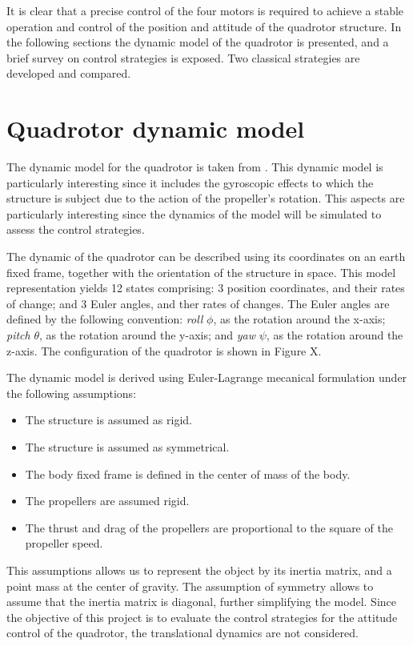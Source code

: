 \documentclass[12pt]{article}
\begin{document}
It is clear that a precise control of the four motors is required to achieve a stable operation and control of the position and attitude of the quadrotor structure. In the following sections the dynamic model of the quadrotor is presented, and a brief survey on control strategies is exposed. Two classical strategies are developed and compared.

\section{Quadrotor dynamic model}
The dynamic model for the quadrotor is taken from \cite{Boua04}. This dynamic model is particularly interesting since it includes the gyroscopic effects to which the structure is subject due to the action of the propeller's rotation. This aspects are particularly interesting since the dynamics of the model will be simulated to assess the control strategies.

The dynamic of the quadrotor can be described using its coordinates on an earth fixed frame, together with the orientation of the structure in space. This model representation yields 12 states comprising: 3 position coordinates, and their rates of change; and 3 Euler angles, and ther rates of changes. The Euler angles are defined by the following convention: \emph{roll} $\phi$, as the rotation around the x-axis; \emph{pitch} $\theta$, as the rotation around the y-axis; and \emph{yaw} $\psi$, as the rotation around the z-axis. The configuration of the quadrotor is shown in Figure X.

The dynamic model is derived using Euler-Lagrange mecanical formulation under the following assumptions:

\begin{itemize}
\item The structure is assumed as rigid.
\item The structure is assumed as symmetrical.
\item The body fixed frame is defined in the center of mass of the body.
\item The propellers are assumed rigid.
\item The thrust and drag of the propellers are proportional to the square of the propeller speed.
\end{itemize}

This assumptions allows us to represent the object by its inertia matrix, and a point mass at the center of gravity. The assumption of symmetry allows to assume that the inertia matrix is diagonal, further simplifying the model. Since the objective of this project is to evaluate the control strategies for the attitude control of the quadrotor, the translational dynamics are not considered. 
\end{document}
